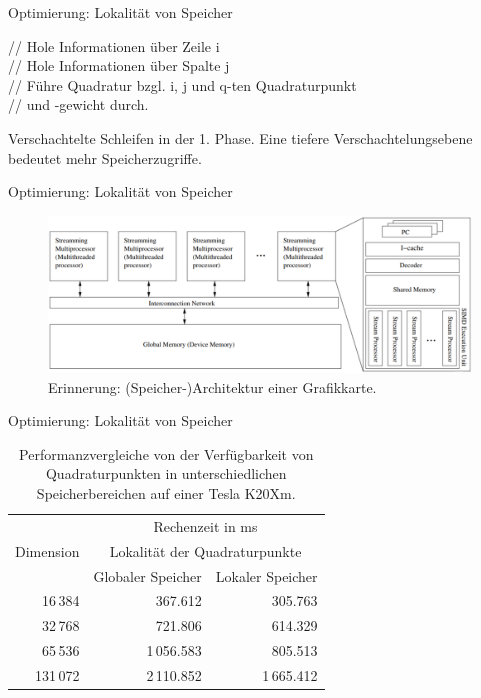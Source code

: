 \documentclass[10pt]{beamer}
\begin{document}
\begin{frame}{Optimierung: Lokalit\"at von Speicher}
  \begin{algorithm}[H]
    {
      {
        // Hole Informationen \"uber Zeile i \\
        {
          // Hole Informationen \"uber Spalte j \\

          {
            // F\"uhre Quadratur bzgl. i, j und q-ten Quadraturpunkt \\
            // und -gewicht durch.
          }
        }
      }      
    }
    \caption{Verschachtelte Schleifen in der 1. Phase. Eine tiefere
             Verschachtelungsebene bedeutet mehr Speicherzugriffe.}
  \end{algorithm}
\end{frame}

\begin{frame}{Optimierung: Lokalit\"at von Speicher}
  \begin{figure}
    \centering
    \includegraphics[width=\linewidth]{figures/fg-gpu_architecture.pdf}
    \caption{Erinnerung: (Speicher-)Architektur einer Grafikkarte.}
  \end{figure}
\end{frame}

\begin{frame}{Optimierung: Lokalität von Speicher}
  \small
  \begin{table}
    \begin{tabular}{rrr} \toprule
      \multirow{3}{*}{Dimension} & \multicolumn{2}{c}{Rechenzeit in ms} \\ \cmidrule{2-3}
      & \multicolumn{2}{c}{Lokalität der Quadraturpunkte} \\ \cmidrule{2-3}
      & Globaler Speicher & Lokaler Speicher \\ \cmidrule{1-3}
       16\,384 &    367.612 &    305.763  \\ %
       32\,768 &    721.806 &    614.329  \\
       65\,536 & 1\,056.583 &    805.513  \\
      131\,072 & 2\,110.852 & 1\,665.412 \\
      \bottomrule
    \end{tabular}
    \caption{Performanzvergleiche von der Verfügbarkeit von Quadraturpunkten
             in unterschiedlichen Speicherbereichen auf einer Tesla K20Xm.}
  \end{table}
  \normalsize
\end{frame}
\end{document}
